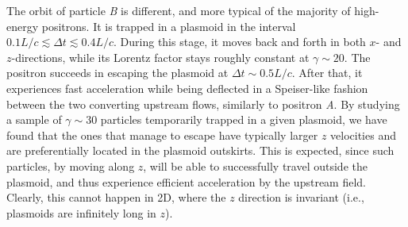 \documentclass[twocolumn,twocolappendix]{aastex63}
\begin{document}
The orbit of particle \emph{B} is different, and more typical of the majority of high-energy positrons. It is trapped in a plasmoid in the interval $0.1L/c\lesssim \Delta t\lesssim0.4L/c$. During this stage, it moves back and forth in both  $x$- and  $z$-directions, while its Lorentz factor stays roughly constant at $\gamma\sim 20$. The positron succeeds in escaping the plasmoid at $\Delta t\sim 0.5 L/c$. After that, it experiences fast acceleration while being deflected in a Speiser-like fashion between the two converting upstream flows, similarly to positron \emph{A}. By studying a sample of $\gamma\sim 30$ particles temporarily trapped in a given plasmoid, we have found that the ones that manage to escape have typically larger $z$ velocities and are preferentially located in the plasmoid outskirts. This is expected, since such particles, by moving along $z$, will be able to successfully travel outside the plasmoid, and thus experience efficient acceleration by the upstream field. Clearly, this cannot happen in 2D, where the $z$ direction is invariant (i.e., plasmoids are infinitely long in $z$).


\end{document}
